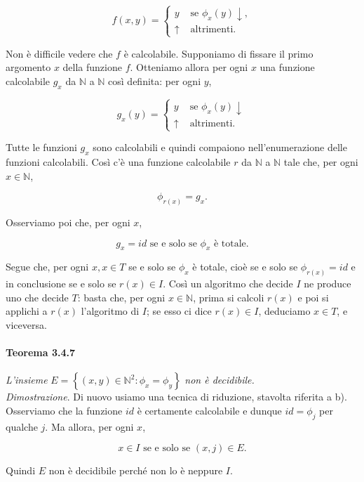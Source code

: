 \[
    f(x, y)= \begin{cases}y & \text { se } \phi_x(y) \downarrow, \\ \uparrow & \text { altrimenti. }\end{cases}
\]

Non è difficile vedere che $f$ è calcolabile. Supponiamo di fissare il primo
argomento $x$ della funzione $f$. Otteniamo allora per ogni $x$ una funzione
calcolabile $g_x$ da $\mathbb{N}$ a $\mathbb{N}$ così definita: per ogni $y$,

\[
    g_x(y)= \begin{cases}y & \text { se } \phi_x(y) \downarrow \\ \uparrow & \text { altrimenti. }\end{cases}
\]

Tutte le funzioni $g_x$ sono calcolabili e quindi compaiono nell'enumerazione
delle funzioni calcolabili. Così c'è una funzione calcolabile $r$ da
$\mathbb{N}$ a $\mathbb{N}$ tale che, per ogni $x \in \mathbb{N}$,

\[
    \phi_{r(x)}=g_x .
\]

Osserviamo poi che, per ogni $x$,

\[
    g_x = id \text{ se e solo se } \phi_x \text{ è totale.}
\]

Segue che, per ogni $x, x \in T$ se e solo se $\phi_x$ è totale, cioè se e solo
se $\phi_{r(x)}=i d$ e in conclusione se e solo se $r(x) \in I$. Così un
algoritmo che decide $I$ ne produce uno che decide $T$: basta che, per ogni $x
    \in \mathbb{N}$, prima si calcoli $r(x)$ e poi si applichi a $r(x)$ l'algoritmo
di $I$; se esso ci dice $r(x) \in I$, deduciamo $x \in T$, e viceversa.

\paragraph{Teorema 3.4.7} \textit{L'insieme} $E=\left\{(x, y) \in \mathbb{N}^2:
    \phi_x=\phi_y\right\}$ \textit{non è decidibile.}\\

\textit{Dimostrazione}. Di nuovo usiamo una tecnica di riduzione, stavolta
riferita a b). Osserviamo che la funzione $i d$ è certamente calcolabile e
dunque $i d=\phi_j$ per qualche $j$. Ma allora, per ogni $x$,

\[
    x \in I \text { se e solo se }(x, j) \in E .
\]

Quindi $E$ non è decidibile perché non lo è neppure $I$.